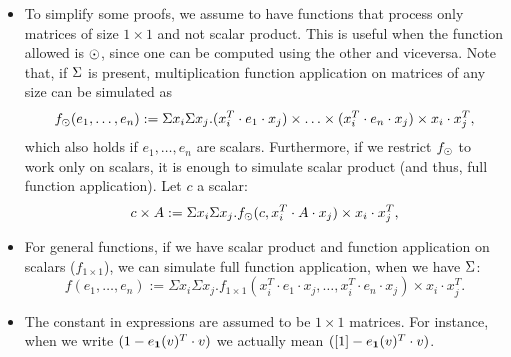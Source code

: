 \begin{itemize}


\item To simplify some proofs, we assume \langfor to have functions that process only matrices of size $1\times 1$ 
and not scalar product. This is useful when the function allowed is $\odot$, since one can be computed using the other and viceversa.
Note that, if $\Sigma$ is present, multiplication function application on matrices of any size can be simulated as 
$$
f_{\odot}(e_1,\ldots, e_n) :=\Sigma x_i \Sigma x_j. (x_i^T\cdot e_1\cdot x_j)\times \ldots \times (x_i^T\cdot e_n\cdot x_j) \times x_i\cdot x_j^T,
$$
which also holds if $e_1,\ldots, e_n$ are scalars. Furthermore, if we restrict $f_{\odot}$ to
work only on scalars, it is enough to simulate scalar product (and thus, full function application). Let $c$ a scalar:
$$
c\times A :=\Sigma x_i \Sigma x_j. f_{\odot}(c, x_i^T\cdot A\cdot x_j) \times x_i\cdot x_j^T,
$$


\item For general functions, if we have scalar product and function application on scalars ($f_{1\times 1}$),
we can simulate full function application, when we have $\Sigma$:
$$
f(e_1,\ldots, e_n) :=\Sigma x_i \Sigma x_j. f_{1\times 1}(x_i^T\cdot e_1\cdot x_j, \ldots ,x_i^T\cdot e_n\cdot x_j) \times x_i\cdot x_j^T.
$$


\item The constant in expressions are assumed to be $1\times 1$ matrices. 
For instance, when we write $(1-e_{\mathbf{1}}(v)^T\cdot v)$ we actually mean $([1]-e_{\mathbf{1}}(v)^T\cdot v)$.


\end{itemize}
